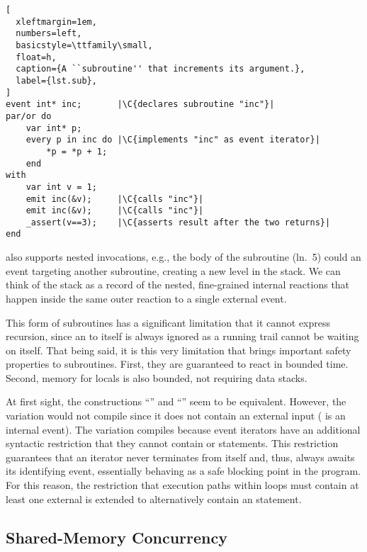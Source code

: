 \begin{lstlisting}[
  xleftmargin=1em,
  numbers=left,
  basicstyle=\ttfamily\small,
  float=h,
  caption={A ``subroutine'' that increments its argument.},
  label={lst.sub},
]
event int* inc;       |\C{declares subroutine "inc"}|
par/or do
    var int* p;
    every p in inc do |\C{implements "inc" as event iterator}|
        *p = *p + 1;
    end
with
    var int v = 1;
    emit inc(&v);     |\C{calls "inc"}|
    emit inc(&v);     |\C{calls "inc"}|
    _assert(v==3);    |\C{asserts result after the two returns}|
end
\end{lstlisting}


\CEU also supports nested  invocations, e.g., the body of the
subroutine  (ln.~5) could  an event targeting another
subroutine, creating a new level in the stack.
%
We can think of the stack as a record of the nested, fine-grained internal
reactions that happen inside the same outer reaction to a single external
event.

This form of subroutines has a significant limitation that it cannot express
recursion, since an  to itself is always ignored as a running trail
cannot be waiting on itself.
%
That being said, it is this very limitation that brings important safety
properties to subroutines.
%
First, they are guaranteed to react in bounded time.
%
Second, memory for locals is also bounded, not requiring data stacks.

At first sight, the constructions ``'' and
``'' seem to be equivalent.
However, the  variation would not compile since it does not contain
an external input  ( is an internal event).
%
The  variation compiles because event iterators have an additional
syntactic restriction that they cannot contain  or 
statements.
This restriction guarantees that an iterator never terminates from itself and,
thus, always awaits its identifying event, essentially behaving as a safe
blocking point in the program.
%
For this reason, the restriction that execution paths within loops must
contain at least one external  is extended to alternatively contain
an  statement.

\subsection{Shared-Memory Concurrency}
\label{sec.ceu.shared}

